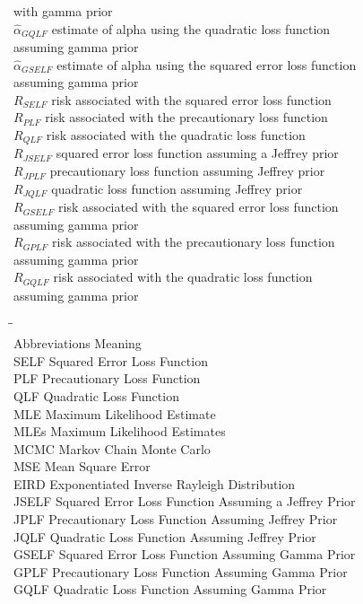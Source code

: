 \documentclass[a4paper,12pt]{report}
\begin{document}
\begin{tabbing}
	\>\> with gamma prior\\
	\>$\hat{\alpha}_{GQLF}$ \> estimate of alpha using the quadratic loss function\\
	\>\> assuming gamma prior\\
	\>$\hat{\alpha}_{GSELF}$ \> estimate of alpha using the squared error loss function\\
	\>\> assuming gamma prior\\
	\>$R_{SELF}$ \> risk associated with the squared error loss function\\
	\>$R_{PLF}$ \>risk associated with the precautionary loss function \\
	\>$R_{QLF}$ \> risk associated with the quadratic loss function\\
	\>$R_{JSELF}$ \> squared error loss function assuming a Jeffrey prior\\
	\>$R_{JPLF}$ \> precautionary loss function assuming Jeffrey prior\\
	\>$R_{JQLF}$ \> quadratic loss function assuming Jeffrey prior\\
	\>$R_{GSELF}$ \> risk associated with the squared error loss function\\
	\>\> assuming gamma prior\\
	\>$R_{GPLF}$ \> risk associated with the precautionary loss function\\
	\>\> assuming gamma prior\\
	\>$R_{GQLF}$ \> risk associated with the quadratic loss function\\
	\>\> assuming gamma prior\\
\end{tabbing}
\begin{tabbing}\hspace{0.5cm}\=\hspace{4cm}\=\kill\\
	\>Abbreviations \> Meaning\\
	\>SELF \> Squared Error Loss Function\\
	\>PLF \> Precautionary Loss Function\\
	\>QLF \> Quadratic Loss Function\\
	\>MLE \> Maximum Likelihood Estimate\\
	\>MLEs \> Maximum Likelihood Estimates\\
	\>MCMC \> Markov Chain Monte Carlo\\
	\>MSE \> Mean Square Error\\
	\>EIRD \> Exponentiated Inverse Rayleigh Distribution\\
	\>JSELF \> Squared Error Loss Function Assuming a Jeffrey Prior\\
	\>JPLF \> Precautionary Loss Function Assuming Jeffrey Prior\\
	\>JQLF \> Quadratic Loss Function Assuming Jeffrey Prior\\
	\>GSELF \> Squared Error Loss Function Assuming Gamma Prior\\
	\>GPLF \> Precautionary Loss Function Assuming Gamma Prior\\
	\>GQLF \> Quadratic Loss Function Assuming Gamma Prior\\
	
\end{tabbing}
\end{document}
